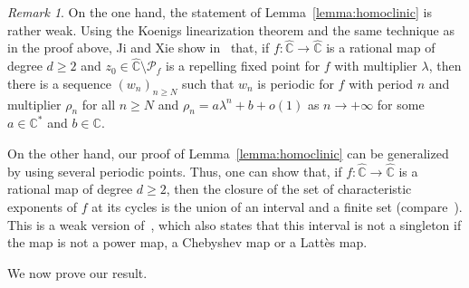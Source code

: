 \documentclass[JEP,XML,SOM,Unicode,published]{cedram}
\theoremstyle{plain}
\theoremstyle{definition}
\theoremstyle{remark}
\newtheorem{remark}[theorem]{Remark}
\begin{document}
\begin{remark}
On the one hand, the statement of Lemma~\ref{lemma:homoclinic} is rather weak. Using the Koenigs linearization theorem and the same technique as in the proof above, Ji and Xie show in~\cite[\S2]{JX2022} that, if $f \colon \widehat{\mathbb{C}} \to \widehat{\mathbb{C}}$ is a rational map of degree $d \geq 2$ and $z_{0} \in \widehat{\mathbb{C}} \setminus \mathcal{P}_{f}$ is a repelling fixed point for $f$ with multiplier $\lambda$, then there is a sequence $(w_{n})_{n \geq N}$ such that $w_{n}$ is periodic for $f$ with period $n$ and multiplier $\rho_{n}$ for all $n \geq N$ and $\rho_{n} = a \lambda^{n} +b +o(1)$ as $n \to +\infty$ for some $a \in \mathbb{C}^{*}$ and $b \in \mathbb{C}$.

On the other hand, our proof of Lemma~\ref{lemma:homoclinic} can be generalized by using several periodic points. Thus, one can show that, if $f \colon \widehat{\mathbb{C}} \to \widehat{\mathbb{C}}$ is a rational map of degree $d \geq 2$, then the closure of the set of characteristic exponents of $f$ at its cycles is the union of an interval and a finite set (compare~\cite[Proof of Lem.\,2.1]{FG2022}). This is a weak version of~\cite[Cor.\,1.16]{JX2022}, which also states that this interval is not a singleton if the map is not a power map, a Chebyshev map or a Lattès map.
\end{remark}

We now prove our result.
\end{document}

